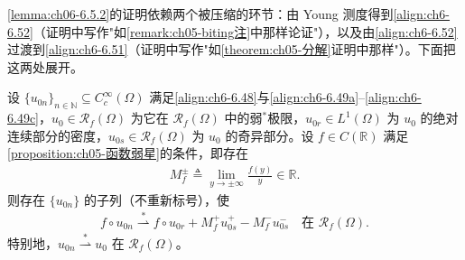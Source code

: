 \documentclass[../../main.tex]{subfiles}%
\begin{document}
\cref{lemma:ch06-6.5.2}的证明依赖两个被压缩的环节：由 Young 测度得到\eqref{align:ch6-6.52}（证明中写作"如\cref{remark:ch05-biting注}中那样论证"），以及由\eqref{align:ch6-6.52}过渡到\eqref{align:ch6-6.51}（证明中写作"如\cref{theorem:ch05-分解}证明中那样"）。下面把这两处展开。

\begin{lemma}[初值序列的非线性弱极限]\label{lemma:ch06-6.5.2}
设 $\{u_{0n}\}_{n\in\mathbb{N}}\subseteq C^\infty_c(\Omega)$ 满足\eqref{align:ch6-6.48}与\eqref{align:ch6-6.49a}--\eqref{align:ch6-6.49c}，$u_0\in\mathscr{R}_f(\Omega)$ 为它在 $\mathscr{R}_f(\Omega)$ 中的弱$^*$极限，$u_{0r}\in L^1(\Omega)$ 为 $u_0$ 的绝对连续部分的密度，$u_{0s}\in\mathscr{R}_f(\Omega)$ 为 $u_0$ 的奇异部分。设 $f\in C(\mathbb{R})$ 满足\cref{proposition:ch05-函数弱星}的条件，即存在
\begin{align*}
M^\pm_f\triangleq\lim_{y\to\pm\infty}\frac{f(y)}{y}\in\mathbb{R}.
\end{align*}
则存在 $\{u_{0n}\}$ 的子列（不重新标号），使
\begin{align}
f\circ u_{0n}\stackrel{*}{\rightharpoonup}f\circ u_{0r}+M^+_fu^+_{0s}-M^-_fu^-_{0s}
\quad\text{在 }\mathscr{R}_f(\Omega). \label{align:ch6-6.51}
\end{align}
特别地，$u_{0n}\stackrel{*}{\rightharpoonup}u_0$ 在 $\mathscr{R}_f(\Omega)$。
\end{lemma}
\end{document}
